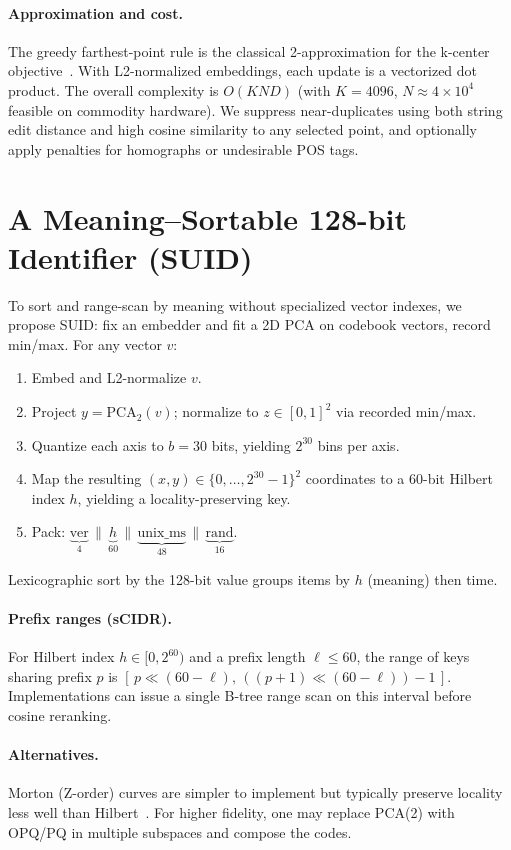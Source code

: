 \documentclass[11pt]{article}
\newcommand{\suid}{\textsc{SUID}}
\begin{document}
\paragraph{Approximation and cost.}
The greedy farthest-point rule is the classical 2-approximation for the k-center objective~\cite{gonzalez}.
With L2-normalized embeddings, each update is a vectorized dot product. The overall complexity is
$O(KND)$ (with $K{=}4096$, $N{\approx}4{\times}10^4$ feasible on commodity hardware).
We suppress near-duplicates using both string edit distance and high cosine similarity to any selected point,
and optionally apply penalties for homographs or undesirable POS tags.

\section{A Meaning--Sortable 128-bit Identifier (\suid)}
\label{sec:suid}
To sort and range-scan by meaning without specialized vector indexes, we propose \suid: fix an embedder and fit a 2D PCA on codebook vectors, record min/max. For any vector $v$:
\begin{enumerate}[leftmargin=2em]
  \item Embed and L2-normalize $v$.
  \item Project $y=\text{PCA}_2(v)$; normalize to $z\in[0,1]^2$ via recorded min/max.
  \item Quantize each axis to $b{=}30$ bits, yielding $2^{30}$ bins per axis.
  \item Map the resulting $(x,y)\in\{0,\dots,2^{30}{-}1\}^2$ coordinates to a 60-bit Hilbert index $h$, yielding a locality-preserving key.
  \item Pack: $\underbrace{\text{ver}}_{4}\,\|\,\underbrace{h}_{60}\,\|\,\underbrace{\text{unix\_ms}}_{48}\,\|\,\underbrace{\text{rand}}_{16}$.
\end{enumerate}
Lexicographic sort by the 128-bit value groups items by $h$ (meaning) then time.

\paragraph{Prefix ranges (sCIDR).}
For Hilbert index $h\in[0,2^{60})$ and a prefix length $\ell\le 60$, the range of keys sharing prefix $p$ is
$[\,p \ll (60{-}\ell),\, ((p{+}1)\ll(60{-}\ell)) - 1\,]$.
Implementations can issue a single B-tree range scan on this interval before cosine reranking.

\paragraph{Alternatives.}
Morton (Z-order) curves are simpler to implement but typically preserve locality less well than Hilbert~\cite{moon}.
For higher fidelity, one may replace PCA(2) with OPQ/PQ in multiple subspaces and compose the codes.
\end{document}
